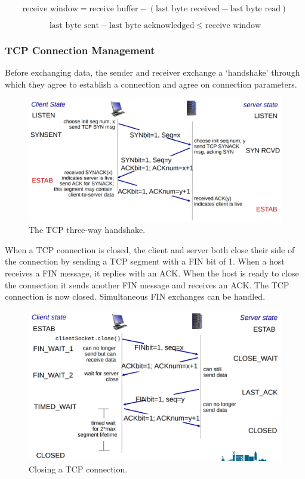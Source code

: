 \begin{equation*}
  \text{receive window} = \text{receive buffer} - \left( \text{last byte received} - \text{last byte read} \right)
\end{equation*}

\begin{equation*}
  \text{last byte sent} - \text{last byte acknowledged} \le \text{receive window}
\end{equation*}

\subsubsection{TCP Connection Management}

Before exchanging data, the sender and receiver exchange a `handshake' through which they agree to establish a connection and agree on connection parameters.

\begin{figure}[htp]
  \centering
  \includegraphics[width=12cm]{unit-18/figures/three-way-handshake.png}
  \caption*{The TCP three-way handshake.}
\end{figure}

When a TCP connection is closed, the client and server both close their side of the connection by sending a TCP segment with a FIN bit of \num{1}.
When a host receives a FIN message, it replies with an ACK.
When the host is ready to close the connection it sends another FIN message and receives an ACK.
The TCP connection is now closed.
Simultaneous FIN exchanges can be handled.

\begin{figure}[htp]
  \centering
  \includegraphics[width=12cm]{unit-18/figures/closing-connection.png}
  \caption*{Closing a TCP connection.}
\end{figure}

